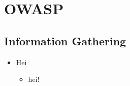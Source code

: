 \chapter{OWASP}

\section{Information Gathering}

	\begin{itemize}
		\item Hei\begin{itemize}
				\item hei!
			\end{itemize}
	\end{itemize}